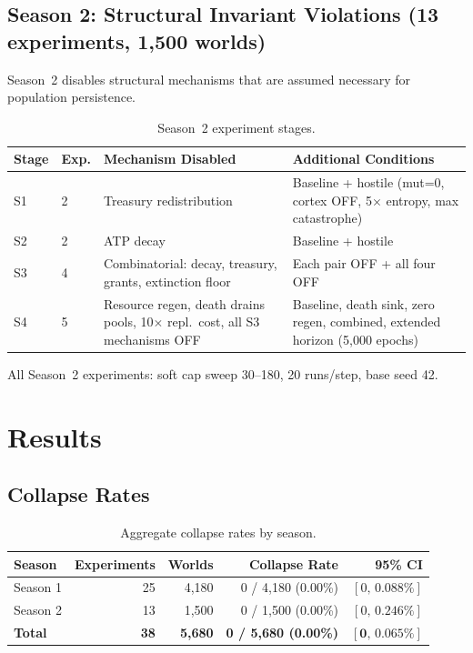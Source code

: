 \documentclass[11pt,a4paper]{article}
\begin{document}
\subsection{Season 2: Structural Invariant Violations (13 experiments, 1,500 worlds)}

Season~2 disables structural mechanisms that are assumed necessary for population persistence.

\begin{table}[H]
\centering
\caption{Season~2 experiment stages.}
\small
\begin{tabular}{@{}llp{5cm}p{4cm}@{}}
\toprule
Stage & Exp. & Mechanism Disabled & Additional Conditions \\
\midrule
S1 & 2 & Treasury redistribution & Baseline + hostile (mut=0, cortex OFF, 5$\times$ entropy, max catastrophe) \\
S2 & 2 & ATP decay & Baseline + hostile \\
S3 & 4 & Combinatorial: decay, treasury, grants, extinction floor & Each pair OFF + all four OFF \\
S4 & 5 & Resource regen, death drains pools, 10$\times$ repl.\ cost, all S3 mechanisms OFF & Baseline, death sink, zero regen, combined, extended horizon (5,000 epochs) \\
\bottomrule
\end{tabular}
\end{table}

All Season~2 experiments: soft cap sweep 30--180, 20 runs/step, base seed 42.

\section{Results}

\subsection{Collapse Rates}

\begin{table}[H]
\centering
\caption{Aggregate collapse rates by season.}
\begin{tabular}{@{}lrrrr@{}}
\toprule
Season & Experiments & Worlds & Collapse Rate & 95\% CI \\
\midrule
Season 1 & 25 & 4,180 & 0 / 4,180 (0.00\%) & $[0,\, 0.088\%]$ \\
Season 2 & 13 & 1,500 & 0 / 1,500 (0.00\%) & $[0,\, 0.246\%]$ \\
\textbf{Total} & \textbf{38} & \textbf{5,680} & \textbf{0 / 5,680 (0.00\%)} & $\mathbf{[0,\, 0.065\%]}$ \\
\bottomrule
\end{tabular}
\end{table}
\end{document}
